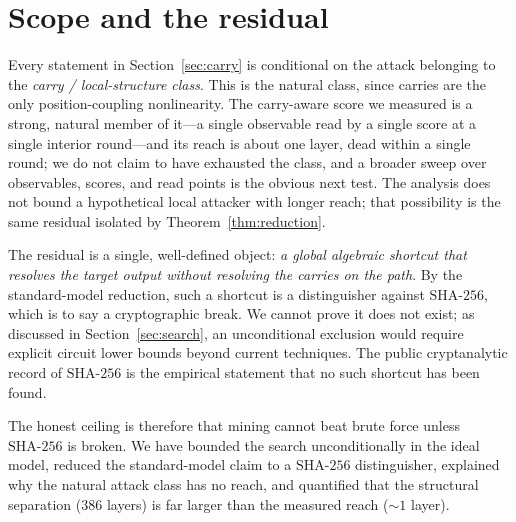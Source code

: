 \documentclass[11pt]{article}
\theoremstyle{remark}
\newcommand{\SHA}{\mathrm{SHA\text{-}256}}
\begin{document}
\section{Scope and the residual}\label{sec:scope}

Every statement in Section~\ref{sec:carry} is conditional on the attack
belonging to the \emph{carry / local-structure class}. This is the
natural class, since carries are the only position-coupling nonlinearity.
The carry-aware score we measured is a strong, natural member of it---a
single observable read by a single score at a single interior round---and
its reach is about one layer, dead within a single round; we do not claim
to have exhausted the class, and a broader sweep over observables, scores,
and read points is the obvious next test. The analysis does not bound a hypothetical local
attacker with longer reach; that possibility is the same residual isolated
by Theorem~\ref{thm:reduction}.

The residual is a single, well-defined object: \emph{a global algebraic
shortcut that resolves the target output without resolving the carries on
the path}. By the standard-model reduction, such a shortcut is a
distinguisher against $\SHA$, which is to say a cryptographic break. We
cannot prove it does not exist; as discussed in
Section~\ref{sec:search}, an unconditional exclusion would require
explicit circuit lower bounds beyond current techniques. The public
cryptanalytic record of $\SHA$ is the empirical statement that no such
shortcut has been found.

The honest ceiling is therefore that mining cannot beat brute force
unless $\SHA$ is broken. We have bounded the search unconditionally in
the ideal model, reduced the standard-model claim to a $\SHA$
distinguisher, explained why the natural attack class has no reach, and
quantified that the structural separation ($386$ layers) is far larger
than the measured reach ($\sim 1$ layer).
\end{document}

